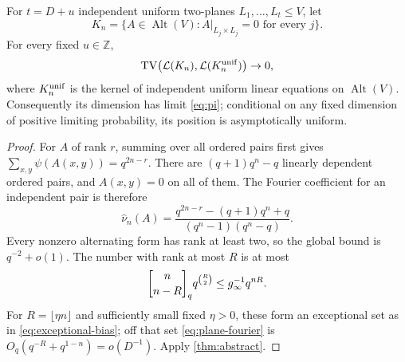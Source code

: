 \begin{theorem}\label{thm:planes}
For $t=D+u$ independent uniform two-planes $L_1,\ldots,L_t\le V$, let
\[
 K_n=\{A\in\operatorname{Alt}(V): A|_{L_j\times L_j}=0
          \text{ for every }j\}.
\]
For every fixed $u\in\mathbb Z$,
\[
 \operatorname{TV}\bigl(\mathcal L(K_n),\mathcal L(K_n^{\rm unif})\bigr)\to0,
\]
where $K_n^{\rm unif}$ is the kernel of independent uniform linear
equations on $\operatorname{Alt}(V)$. Consequently its dimension has
limit \eqref{eq:pi}; conditional on any fixed dimension of positive
limiting probability, its position is asymptotically uniform.
\end{theorem}

\begin{proof}
For $A$ of rank $r$, summing over all ordered pairs first gives
$\sum_{x,y}\psi(A(x,y))=q^{2n-r}$. There are
$(q+1)q^n-q$ linearly dependent ordered pairs, and $A(x,y)=0$ on all of
them. The Fourier coefficient for an independent pair is therefore
\begin{equation}\label{eq:plane-fourier}
 \widehat\nu_n(A)=
 \frac{q^{2n-r}-(q+1)q^n+q}{(q^n-1)(q^n-q)}.
\end{equation}
Every nonzero alternating form has rank at least two, so the global
bound is $q^{-2}+o(1)$. The number with rank at most $R$ is at most
\[
 \qbinom n{n-R}q^{\binom R2}
 \le g_\infty^{-1}q^{nR}.
\]
For $R=\lfloor\eta n\rfloor$ and sufficiently small fixed $\eta>0$,
these form an exceptional set as in \eqref{eq:exceptional-bias}; off
that set \eqref{eq:plane-fourier} is
$O_q(q^{-R}+q^{1-n})=o(D^{-1})$. Apply \cref{thm:abstract}.
\end{proof}
